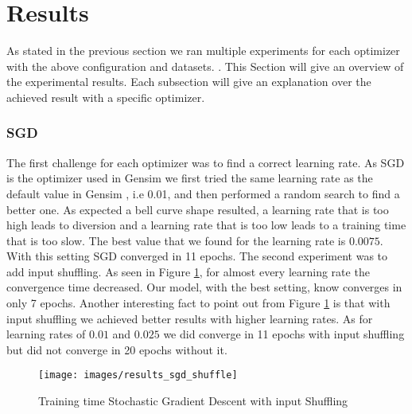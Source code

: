 

\section{Results}\label{sec:results}
As stated in the previous section we ran multiple experiments for each optimizer with the above configuration and datasets. . This Section will  give an overview of the experimental results. Each subsection will give an explanation over the achieved result with a specific optimizer.

\subsubsection{SGD}
The first challenge for each optimizer was to find a correct learning rate. As SGD is the optimizer used in Gensim \cite{gensim} we first tried the same learning rate as the default value in Gensim \cite{gensim}, i.e 0.01,  and then performed a random search to find a better one. As expected a bell curve shape resulted, a learning rate that is too high leads to diversion and a learning rate that is too low leads to a training time that is too slow. The best value that we found for the learning rate is $0.0075$. With this setting SGD converged in 11 epochs. The second experiment was to add input shuffling.
As seen in Figure \ref{fig:results_sgd}, for almost every learning rate the convergence time decreased. Our model, with the best setting, know converges in only 7 epochs. Another interesting fact to point out from Figure \ref{fig:results_sgd} is that with input shuffling we achieved better results with higher learning rates. As for learning rates of $0.01$ and $0.025$ we did converge in 11 epochs with input shuffling but did not converge in 20 epochs without it.

\begin{figure}[h]
\centering
\texttt{[image: images/results\_sgd\_shuffle]}
\caption{Training time Stochastic Gradient Descent with input Shuffling}
\label{fig:results_sgd}
\end{figure}
